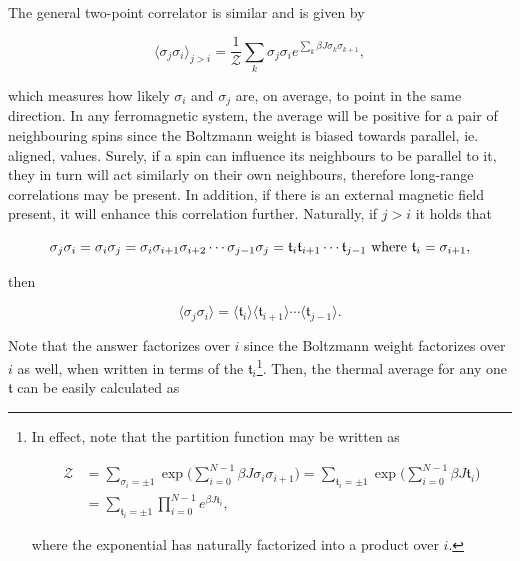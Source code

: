 \documentclass{homework}
\begin{document}
\blanky \\

The general two-point correlator is similar and is given by 

\begin{equation}
    \langle \sigma_j \sigma_i \rangle_{j > i} = \frac{1}{\mathcal{Z}} \sum_{k} \sigma_j \sigma_i e^{\sum_{k} \beta J \sigma_k \sigma_{k+1}},
\end{equation}

which measures how likely $\sigma_i$ and $\sigma_j$ are, on average, to point in the same direction. In any ferromagnetic system, the average will be positive for a pair of neighbouring spins since the Boltzmann weight is biased towards parallel, ie. aligned, values. Surely, if a spin can influence its neighbours to be parallel to it, they in turn will act similarly on their own neighbours, therefore long-range correlations may be present. In addition, if there is an external magnetic field present, it will enhance this correlation further. Naturally, if $j>i$ it holds that 

$$
\sigma_j \sigma_i = \sigma_i \sigma_j = \sigma_i \sigma_{i+1} \sigma_{i+2} \cdots \sigma_{j-1} \sigma_j = \mathfrak{t}_{i}\mathfrak{t}_{i+1}\cdots\mathfrak{t}_{j-1} \textnormal{ where } \mathfrak{t}_i = \sigma_{i+1}, 
$$

then 

\begin{equation}
    \langle \sigma_j \sigma_i \rangle = \langle \mathfrak{t}_i \rangle \langle \mathfrak{t}_{i+1} \rangle \cdots \langle \mathfrak{t}_{j-1} \rangle.
\end{equation}

Note that the answer factorizes over $i$ since the Boltzmann weight factorizes over $i$ as well, when written in terms of the $\mathfrak{t}_i$\footnote{In effect, note that the partition function may be written as 

\begin{equation}
\begin{split}
    \mathcal{Z} &= \sum_{\sigma_i = \pm 1} \exp \bigg(\sum_{i=0}^{N-1} \beta J \sigma_i \sigma_{i+1} \bigg) = \sum_{\mathfrak{t}_i = \pm 1} \exp \bigg(\sum_{i=0}^{N-1} \beta J \mathfrak{t}_i \bigg) \\
    &= \sum_{\mathfrak{t}_i = \pm 1} \prod_{i=0}^{N-1} e^{\beta J \mathfrak{t}_i},
\end{split}
\end{equation}

where the exponential has naturally factorized into a product over $i$.}. Then, the thermal average for any one $\mathfrak{t}$ can be easily calculated as 
\end{document}
